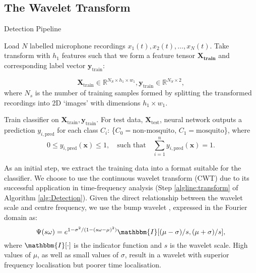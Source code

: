 \documentclass[10pt, twocolumn]{llncs}
\newcommand{\srN}[1]{\todo[inline, size=\small, color=cyan!30]{[sr] #1}}
\begin{document}
\subsection{The Wavelet Transform}
\label{subsec:wavSTFT}
%
%
\begin{algorithm}[]
	
	\caption{Detection Pipeline}
	\label{alg:Detection}
	\begin{algorithmic}[1]
	\State Load $N$ labelled microphone recordings $x_1(t), x_2(t), \ldots, x_N(t)$.
    \State Take{} transform with $h_1$ features such that we form a feature tensor $\mathbf{X_\text{train}}$ and corresponding label vector $\mathbf{y}_\text{train}$:
       
    $$\mathbf{X}_\textrm{train} \in \mathbb{R}^{N_S
 			\times h_1 \times w_1}, \mathbf{y}_\textrm{train} \in \mathbb{R}^{N_S \times 2},$$
    where $N_s$ is the number of training samples formed by splitting the transformed recordings into 2D `images' with dimensions $h_1 \times w_1$. 
    \label{algline:transform}


	\label{line:method:stft}
  	\State Train classifier on $\mathbf{X}_\textrm{train}, \mathbf{y}_\textrm{train}$.
	\State For test data, $\mathbf{X}_\textrm{test}$, neural network outputs a prediction $y_{i,\textrm{pred}}$ for each class $C_i$: \{$C_0 = \textrm{non-mosquito}$, $C_1 = \textrm{mosquito}$\}, where
			 $$ 0 \leq y_{i,\textrm{pred}}(\mathbf{x}) \leq 1, \quad \textrm{such that} \quad \sum_{i=1}^{n} y_{i,\textrm{pred}}(\mathbf{x}) = 1. $$
	\end{algorithmic}
\end{algorithm}

As an initial step, we extract the training data into a format suitable for the classifier. We choose to use the continuous wavelet transform (CWT) due to its successful application in time-frequency analysis \cite{daubechies2011synchrosqueezed} (Step \ref{algline:transform} of Algorithm \ref{alg:Detection}). Given the direct relationship between the wavelet scale and centre frequency, we use the bump wavelet \cite{vialatte2009bump}, expressed in the Fourier domain as:
\begin{equation} 
\Psi(s\omega) = e^{1 - \sigma^2/(1 - (s\omega - \mu)^2)} 
   \mathbbm{I}[(\mu - \sigma)/s, (\mu + \sigma)/s],
\label{eq:bump}   
\end{equation}
where $\mathbbm{I}[\cdot]$ is the indicator function and $s$ is the wavelet scale. High values of $\mu$, as well as small values of $\sigma$, result in a wavelet with superior frequency localisation but poorer time localisation. 
\end{document}
